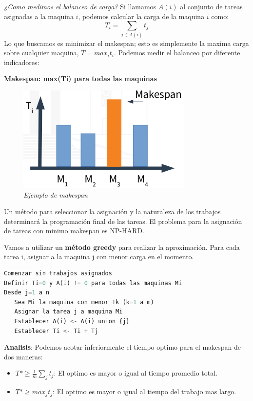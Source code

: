 \documentclass{article}
\begin{document}
\textit{¿Como medimos el balanceo de carga?} Si llamamos \(A(i)\) al conjunto de tareas asignadas a la 
maquina \(i\), podemos calcular la carga de la maquina \(i\) como:
\[
    T_i=\sum_{ j\in A(i)}t_j
\]
Lo que buscamos es minimizar el makespan; esto es simplemente la maxima carga 
sobre cualquier maquina, \(T = max_i t_i\). Podemos medir el balanceo por diferente indicadores:

\textbf{Makespan: max(Ti) para todas las maquinas}

\begin{figure}[h!]
    \begin{center} 
    \includegraphics[scale=0.4]{imagenes/grafico-makespan.png}
    \caption{\small \sl Ejemplo de makespan} 
    \end{center}
\end{figure}

Un método para seleccionar la asignación y la naturaleza de los trabajos determinará
la programación final de las tareas. El problema para la asignación de tareas con minimo makespan 
es NP-HARD.

Vamos a utilizar un \textbf{método greedy} para realizar la aproximación. Para cada tarea i, asignar a la maquina j
con menor carga en el momento.

\begin{lstlisting}[language=Python, caption=Algoritmo de aproximación greedy]
Comenzar sin trabajos asignados
Definir Ti=0 y A(i) != 0 para todas las maquinas Mi
Desde j=1 a n
   Sea Mi la maquina con menor Tk (k=1 a m)
   Asignar la tarea j a maquina Mi
   Establecer A(i) <- A(i) union {j}
   Establecer Ti <- Ti + Tj

\end{lstlisting}    

\textbf{Analisis}: Podemos acotar inferiormente el tiempo optimo para el makespan de dos maneras:

\begin{itemize}
    \item \(T* \geq \frac{1}{m}\sum_{j}t_j\): El optimo es mayor o igual al tiempo promedio total.
    \item \(T* \geq max_j t_j\): El optimo es mayor o igual al tiempo del trabajo mas largo.
\end{itemize}
\end{document}
